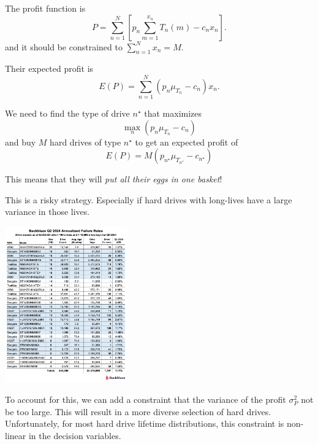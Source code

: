 \begin{solution}
\begin{slide}
\begin{parts}
\item The profit function is
\[
P = \sum_{n=1}^N \left[p_n \sum_{m=1}^{x_n} T_n(m) - c_n x_n\right].
\]
and it should be constrained to $\sum_{n=1}^N x_n = M$.

\item Their expected profit is
\[
E(P) = \sum_{n=1}^N (p_n \mu_{T_n} - c_n )x_n.
\]
	
\item We need to find the type of drive $n^\star$ that maximizes
\[ \max_n (p_n \mu_{T_n} - c_n) \]
and buy $M$ hard drives of type $n^\star$ to get an expected profit of 
\[ 
E(P) = M (p_{n^\star} \mu_{T_{n^\star}} - c_{n^\star})
\]
\end{parts}
	
\end{slide}
	
\end{solution}



\begin{slide}

This means that they will \textit{put all their eggs in one basket}!

This is a risky strategy. Especially if hard drives with long-lives have a large variance in those lives.

\includegraphics[width=150pt]{images/backblaze-hdd.png}

To account for this, we can add a constraint that the variance of the profit $\sigma_P^2$ not be too large.
This will result in a more diverse selection of hard drives.
Unfortunately, for most hard drive lifetime distributions, this constraint is non-linear in the decision variables. 

	
\end{slide}






